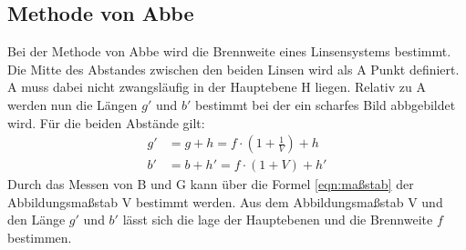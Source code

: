 \subsection{Methode von Abbe}
Bei der Methode von Abbe wird die Brennweite eines Linsensystems bestimmt.
Die Mitte des Abstandes zwischen den beiden Linsen wird als A Punkt definiert.
A muss dabei nicht zwangsläufig in der Hauptebene H liegen.
Relativ zu A werden nun die Längen $g'$ und $b'$ bestimmt bei der ein scharfes Bild abbgebildet wird.
Für die beiden Abstände gilt:
\begin{align*}
  g'&=g+h=f\cdot\left(1+\frac{1}{V}\right)+h\\
  b'&=b+h'=f\cdot(1+V)+h'
\end{align*}
Durch das Messen von B und G kann über die Formel \ref{eqn:maßstab} der Abbildungsmaßstab V bestimmt werden.
Aus dem Abbildungsmaßstab V und den Länge $g'$ und $b'$ lässt sich die lage der Hauptebenen und die Brennweite $f$ bestimmen.
